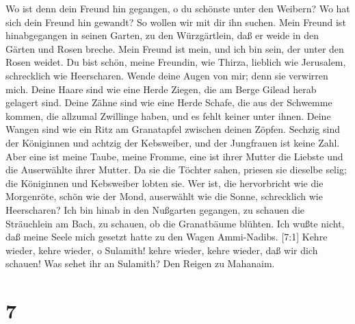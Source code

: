  Wo ist denn dein Freund hin gegangen, o du schönste unter
den Weibern? Wo hat sich dein Freund hin gewandt? So wollen wir mit dir
ihn suchen.  Mein Freund ist hinabgegangen in seinen Garten,
zu den Würzgärtlein, daß er weide in den Gärten und Rosen breche.
 Mein Freund ist mein, und ich bin sein, der unter den Rosen
weidet.  Du bist schön, meine Freundin, wie Thirza, lieblich
wie Jerusalem, schrecklich wie Heerscharen.  Wende deine
Augen von mir; denn sie verwirren mich. Deine Haare sind wie eine Herde
Ziegen, die am Berge Gilead herab gelagert sind.  Deine
Zähne sind wie eine Herde Schafe, die aus der Schwemme kommen, die
allzumal Zwillinge haben, und es fehlt keiner unter ihnen. 
Deine Wangen sind wie ein Ritz am Granatapfel zwischen deinen Zöpfen.
 Sechzig sind der Königinnen und achtzig der Kebsweiber, und
der Jungfrauen ist keine Zahl.  Aber eine ist meine Taube,
meine Fromme, eine ist ihrer Mutter die Liebste und die Auserwählte
ihrer Mutter. Da sie die Töchter sahen, priesen sie dieselbe selig; die
Königinnen und Kebsweiber lobten sie.  Wer ist, die
hervorbricht wie die Morgenröte, schön wie der Mond, auserwählt wie die
Sonne, schrecklich wie Heerscharen?  Ich bin hinab in den
Nußgarten gegangen, zu schauen die Sträuchlein am Bach, zu schauen, ob
die Granatbäume blühten.  Ich wußte nicht, daß meine Seele
mich gesetzt hatte zu den Wagen Ammi-Nadibs.  {[}7:1{]}
Kehre wieder, kehre wieder, o Sulamith! kehre wieder, kehre wieder, daß
wir dich schauen! Was sehet ihr an Sulamith? Den Reigen zu Mahanaim.

\hypertarget{section-6}{%
\section{7}\label{section-6}}

